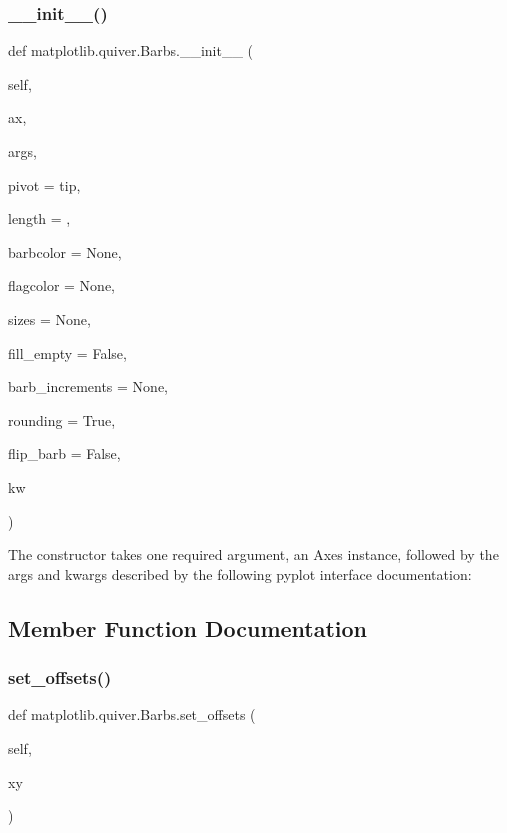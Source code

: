 \subsubsection{\texorpdfstring{\+\_\+\+\_\+init\+\_\+\+\_\+()}{\_\_init\_\_()}}
{\footnotesize\ttfamily def matplotlib.\+quiver.\+Barbs.\+\_\+\+\_\+init\+\_\+\+\_\+ (\begin{DoxyParamCaption}\item[{}]{self,  }\item[{}]{ax,  }\item[{}]{args,  }\item[{}]{pivot = {\ttfamily \textquotesingle{}tip\textquotesingle{}},  }\item[{}]{length = {},  }\item[{}]{barbcolor = {\ttfamily None},  }\item[{}]{flagcolor = {\ttfamily None},  }\item[{}]{sizes = {\ttfamily None},  }\item[{}]{fill\+\_\+empty = {\ttfamily False},  }\item[{}]{barb\+\_\+increments = {\ttfamily None},  }\item[{}]{rounding = {\ttfamily True},  }\item[{}]{flip\+\_\+barb = {\ttfamily False},  }\item[{}]{kw }\end{DoxyParamCaption})}

\begin{DoxyVerb}The constructor takes one required argument, an Axes
instance, followed by the args and kwargs described
by the following pyplot interface documentation:
\end{DoxyVerb}
 

\subsection{Member Function Documentation}
\mbox{\label{classmatplotlib_1_1quiver_1_1Barbs_ab1500541958a20b317abe5ec916bc681}} 
\subsubsection{\texorpdfstring{set\+\_\+offsets()}{set\_offsets()}}
{\footnotesize\ttfamily def matplotlib.\+quiver.\+Barbs.\+set\+\_\+offsets (\begin{DoxyParamCaption}\item[{}]{self,  }\item[{}]{xy }\end{DoxyParamCaption})}

